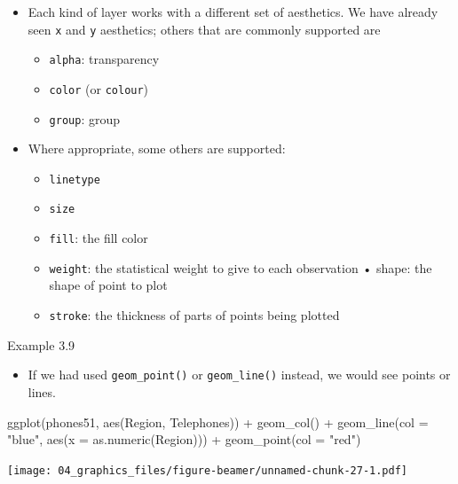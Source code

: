 \documentclass[
  9pt,
  a4paper,
  ignorenonframetext,
  notheorems]{beamer}
\newenvironment{Shaded}{\begin{snugshade}}{\end{snugshade}}
\newcommand{\AttributeTok}[1]{\textcolor[rgb]{0.40,0.45,0.13}{#1}}
\newcommand{\FunctionTok}[1]{\textcolor[rgb]{0.28,0.35,0.67}{#1}}
\newcommand{\NormalTok}[1]{\textcolor[rgb]{0.00,0.23,0.31}{#1}}
\newcommand{\SpecialCharTok}[1]{\textcolor[rgb]{0.37,0.37,0.37}{#1}}
\newcommand{\StringTok}[1]{\textcolor[rgb]{0.13,0.47,0.30}{#1}}
\providecommand{\tightlist}{%
  \setlength{\itemsep}{0pt}\setlength{\parskip}{0pt}}\usepackage{longtable,booktabs,array}
\begin{document}
\begin{frame}[fragile]
\begin{itemize}
\tightlist
\item
  Each kind of layer works with a different set of aesthetics. We have
  already seen \texttt{x} and \texttt{y} aesthetics; others that are
  commonly supported are

  \begin{itemize}
  \tightlist
  \item
    \texttt{alpha}: transparency
  \item
    \texttt{color} (or \texttt{colour})
  \item
    \texttt{group}: group
  \end{itemize}
\item
  Where appropriate, some others are supported:

  \begin{itemize}
  \tightlist
  \item
    \texttt{linetype}
  \item
    \texttt{size}
  \item
    \texttt{fill}: the fill color
  \item
    \texttt{weight}: the statistical weight to give to each observation
    • shape: the shape of point to plot
  \item
    \texttt{stroke}: the thickness of parts of points being plotted
  \end{itemize}
\end{itemize}

\begin{block}{Example 3.9}
\protect\hypertarget{example-3.9}{}
\begin{itemize}
\tightlist
\item
  If we had used \texttt{geom\_point()} or \texttt{geom\_line()}
  instead, we would see points or lines.
\end{itemize}
\end{block}
\end{frame}

\begin{frame}[fragile]
\begin{Shaded}
\begin{Highlighting}[]
\FunctionTok{ggplot}\NormalTok{(phones51, }\FunctionTok{aes}\NormalTok{(Region, Telephones)) }\SpecialCharTok{+} 
  \FunctionTok{geom\_col}\NormalTok{() }\SpecialCharTok{+} 
  \FunctionTok{geom\_line}\NormalTok{(}\AttributeTok{col =} \StringTok{"blue"}\NormalTok{, }\FunctionTok{aes}\NormalTok{(}\AttributeTok{x =} \FunctionTok{as.numeric}\NormalTok{(Region))) }\SpecialCharTok{+} \FunctionTok{geom\_point}\NormalTok{(}\AttributeTok{col =} \StringTok{"red"}\NormalTok{)}
\end{Highlighting}
\end{Shaded}

\texttt{[image: 04\_graphics\_files/figure-beamer/unnamed-chunk-27-1.pdf]}
\end{frame}
\end{document}
